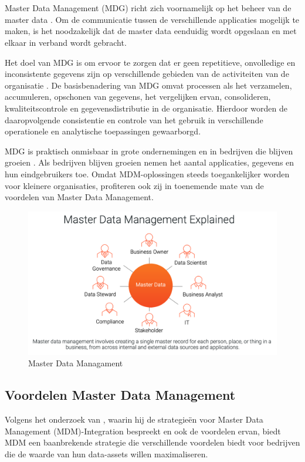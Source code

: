 \section{}%
\label{sec:mdm}
Master Data Management (MDG) richt zich voornamelijk op het beheer van de master data \autocite{Martins2022}. Om de communicatie tussen de verschillende applicaties mogelijk te maken, is het noodzakelijk dat de master data eenduidig wordt opgeslaan en met elkaar in verband wordt gebracht. 

Het doel van MDG is om ervoor te zorgen dat er geen repetitieve, onvolledige en inconsistente gegevens zijn op verschillende gebieden van de activiteiten van de organisatie \autocite{Prokhorov2018}. De basisbenadering van MDG omvat processen als het verzamelen, accumuleren, opschonen van gegevens, het vergelijken ervan, consolideren, kwaliteitscontrole en gegevensdistributie in de organisatie. Hierdoor worden de daaropvolgende consistentie en controle van het gebruik in verschillende operationele en analytische toepassingen gewaarborgd.

MDG is praktisch onmisbaar in grote ondernemingen en in bedrijven die blijven groeien . Als bedrijven blijven groeien nemen het aantal applicaties, gegevens en hun eindgebruikers toe. Omdat MDM-oplossingen steeds toegankelijker worden voor kleinere organisaties, profiteren ook zij in toenemende mate van de voordelen van Master Data Management.

\begin{figure}[htbp]
  \centering
  \includegraphics[scale=0.2]{../images/MasterData.png}
  \caption{Master Data Managament}
\end{figure}

\subsection{Voordelen Master Data Management}
Volgens het onderzoek van \textcite{Pansara2024}, waarin hij de strategieën voor Master Data Management (MDM)-Integration bespreekt en ook de voordelen ervan, biedt MDM een baanbrekende strategie die verschillende voordelen biedt voor bedrijven die de waarde van hun data-assets willen maximaliseren.

